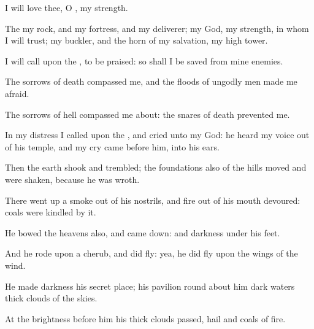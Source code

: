 {\Q {}I will
love thee, O
{}, my
strength.


\par }{\Q {}The
{}
{} my
rock, and my
fortress, and my
deliverer; my
God, my
strength, in whom I will
trust; my
buckler, and the
horn of my
salvation,
{} my high
tower.


\par }{\Q {}I will
call upon the
{},
{} to be
praised: so shall I be
saved from mine
enemies.


\par }{\Q {}The
sorrows of
death
compassed me, and the
floods of ungodly
men made me
afraid.


\par }{\Q {}The
sorrows of
hell compassed me
about: the
snares of
death
prevented me.


\par }{\Q {}In my
distress I
called upon the
{}, and
cried unto my
God: he
heard my
voice out of his
temple, and my
cry
came
before him,
{} into his
ears.


\par }{\Q {}Then the
earth
shook and
trembled; the
foundations also of the
hills
moved and were
shaken, because he was
wroth.


\par }{\Q {}There went
up a
smoke out of his
nostrils, and
fire out of his
mouth
devoured:
coals were
kindled by it.


\par }{\Q {}He
bowed the
heavens also, and came
down: and
darkness
{} under his
feet.


\par }{\Q {}And he
rode upon a
cherub, and did
fly: yea, he did
fly upon the
wings of the
wind.


\par }{\Q {}He
made
darkness his secret
place; his
pavilion round
about him
{}
dark
waters
{} thick
clouds of the
skies.


\par }{\Q {}At the
brightness
{} before him his thick
clouds
passed,
hail
{} and
coals of
fire.


}
